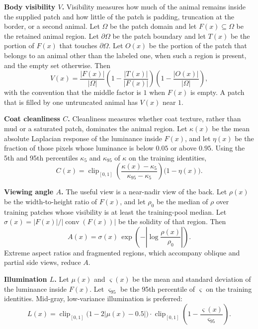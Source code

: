\textbf{Body visibility $V$.}
Visibility measures how much of the animal remains inside the supplied patch and how little of the patch is padding, truncation at the border, or a second animal. Let $\Omega$ be the patch domain and let $F(x)\subseteq\Omega$ be the retained animal region. Let $\partial\Omega$ be the patch boundary and let $T(x)$ be the portion of $F(x)$ that touches $\partial\Omega$. Let $O(x)$ be the portion of the patch that belongs to an animal other than the labeled one, when such a region is present, and the empty set otherwise. Then
\begin{equation}
    V(x)
    =
    \frac{|F(x)|}{|\Omega|}
    \left(1-\frac{|T(x)|}{|F(x)|}\right)
    \left(1-\frac{|O(x)|}{|\Omega|}\right),
    \label{eq:visibility}
\end{equation}
with the convention that the middle factor is $1$ when $F(x)$ is empty. A patch that is filled by one untruncated animal has $V(x)$ near $1$.

\textbf{Coat cleanliness $C$.}
Cleanliness measures whether coat texture, rather than mud or a saturated patch, dominates the animal region. Let $\kappa(x)$ be the mean absolute Laplacian response of the luminance inside $F(x)$, and let $\eta(x)$ be the fraction of those pixels whose luminance is below $0.05$ or above $0.95$. Using the 5th and 95th percentiles $\kappa_{5}$ and $\kappa_{95}$ of $\kappa$ on the training identities,
\begin{equation}
    C(x)
    =
    \operatorname{clip}_{[0,1]}
    \!\left(
        \frac{\kappa(x)-\kappa_{5}}{\kappa_{95}-\kappa_{5}}
    \right)
    \bigl(1-\eta(x)\bigr).
    \label{eq:cleanliness}
\end{equation}

\textbf{Viewing angle $A$.}
The useful view is a near-nadir view of the back. Let $\rho(x)$ be the width-to-height ratio of $F(x)$, and let $\rho_{0}$ be the median of $\rho$ over training patches whose visibility is at least the training-pool median. Let $\sigma(x)=|F(x)|/|\operatorname{conv}(F(x))|$ be the solidity of that region. Then
\begin{equation}
    A(x)
    =
    \sigma(x)\,
    \exp\!\left(
        -\left|\log\frac{\rho(x)}{\rho_{0}}\right|
    \right).
    \label{eq:viewpoint}
\end{equation}
Extreme aspect ratios and fragmented regions, which accompany oblique and partial side views, reduce $A$.

\textbf{Illumination $L$.}
Let $\mu(x)$ and $\varsigma(x)$ be the mean and standard deviation of the luminance inside $F(x)$. Let $\varsigma_{95}$ be the 95th percentile of $\varsigma$ on the training identities. Mid-gray, low-variance illumination is preferred:
\begin{equation}
    L(x)
    =
    \operatorname{clip}_{[0,1]}\!\bigl(1-2|\mu(x)-0.5|\bigr)
    \cdot
    \operatorname{clip}_{[0,1]}\!\left(1-\frac{\varsigma(x)}{\varsigma_{95}}\right).
    \label{eq:illumination}
\end{equation}

